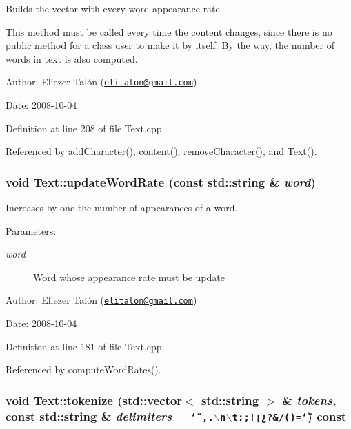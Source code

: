 Builds the vector with every word appearance rate. 

This method must be called every time the content changes, since there is no public method for a class user to make it by itself. By the way, the number of words in text is also computed.

\begin{Desc}
\item[Author:]Eliezer Talón (\href{mailto:elitalon@gmail.com}{\tt elitalon@gmail.com}) \end{Desc}
\begin{Desc}
\item[Date:]2008-10-04 \end{Desc}


Definition at line 208 of file Text.cpp.

Referenced by addCharacter(), content(), removeCharacter(), and Text().\hypertarget{class_text_7466754bf64f0c22b291edb2bd14ba99}{
\subsubsection[updateWordRate]{\setlength{\rightskip}{0pt plus 5cm}void Text::updateWordRate (const std::string \& {\em word})}}
\label{class_text_7466754bf64f0c22b291edb2bd14ba99}


Increases by one the number of appearances of a word. 

\begin{Desc}
\item[Parameters:]
\begin{description}
\item[{\em word}]Word whose appearance rate must be update\end{description}
\end{Desc}
\begin{Desc}
\item[Author:]Eliezer Talón (\href{mailto:elitalon@gmail.com}{\tt elitalon@gmail.com}) \end{Desc}
\begin{Desc}
\item[Date:]2008-10-04 \end{Desc}


Definition at line 181 of file Text.cpp.

Referenced by computeWordRates().\hypertarget{class_text_cf1ad9772327a1d03d03c879e5bfcc24}{
\subsubsection[tokenize]{\setlength{\rightskip}{0pt plus 5cm}void Text::tokenize (std::vector$<$ std::string $>$ \& {\em tokens}, \/  const std::string \& {\em delimiters} = {\tt \char`\"{}~,.$\backslash$n$\backslash$t:;!¡¿?\&/()=\char`\"{}}) const}}
\label{class_text_cf1ad9772327a1d03d03c879e5bfcc24}


